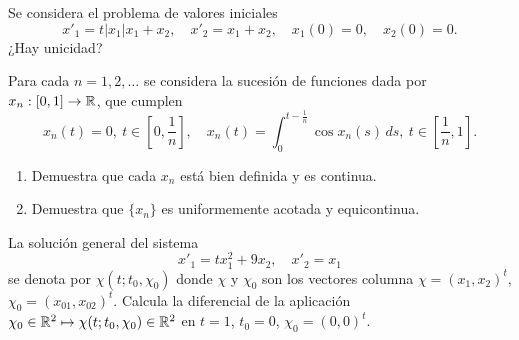 \documentclass[12pt]{article}
\begin{document}
    \begin{ejercicio}
        Se considera el problema de valores iniciales
        \[
        x'_1 = t|x_1|x_1 + x_2, \quad x'_2 = x_1 + x_2, \quad x_1(0) = 0, \quad x_2(0) = 0.
        \]
        ¿Hay unicidad?
    \end{ejercicio}

    \begin{ejercicio}
        Para cada $n = 1, 2, \dots$ se considera la sucesión de funciones dada por $x_n : \left[0, 1\right] \to \mathbb{R}$, que cumplen
        \[
        x_n(t) = 0, \ t \in \left[0, \frac{1}{n}\right], \quad x_n(t) = \int_0^{t-\frac{1}{n}} \cos x_n(s) \, ds, \ t \in \left[\frac{1}{n}, 1\right].
        \]
        \begin{enumerate}[label=\alph*)]
            \item Demuestra que cada $x_n$ está bien definida y es continua.
            \item Demuestra que $\{x_n\}$ es uniformemente acotada y equicontinua.
        \end{enumerate}
    \end{ejercicio}

    \begin{ejercicio}
        La solución general del sistema
        \[
        x'_1 = tx_1^2 + 9x_2, \quad x'_2 = x_1
        \]
        se denota por $\chi(t; t_0, \chi_0)$ donde $\chi$ y $\chi_0$ son los vectores columna $\chi = (x_1, x_2)^t$, $\chi_0 = (x_{01}, x_{02})^t$. Calcula la diferencial de la aplicación $\chi_0 \in \mathbb{R}^2 \mapsto \chi(t; t_0, \chi_0) \in \mathbb{R}^2$ en $t = 1$, $t_0 = 0$, $\chi_0 = (0,0)^t$.
    \end{ejercicio}

    \newpage
    \setcounter{ejercicio}{0} %
\end{document}
